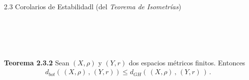 \documentclass{beamer}
\begin{document}
\begin{frame}{2.3 Corolarios de Estabilidadl (del \emph{Teorema de Isometr\'ias})}
    \begin{minipage}{0.45\textwidth}
   $\,$\hfill \scalebox{0.7}{Teorema de Isometr\'ias:$\,\,\,\,\,\,$}
    \end{minipage} \begin{minipage}{0.45\textwidth}
    \end{minipage}\\
    \vspace{1em}
    \centering
    \begin{minipage}{0.2\textwidth}
    \scalebox{0.7}{Teorema 1.5.4:}
    \end{minipage}\begin{minipage}{0.45\textwidth}
    \end{minipage}\\

    \vspace{3em}
    \begin{block}{\textbf{Teorema 2.3.2}}
    Sean $\left( X,\rho\right)$ y $\left( Y,r\right)$ dos espacios m\'etricos finitos. Entonces
    \begin{gather*}
    d_{bot}\left( \,\left( X,\rho\right)\,,\, \left( Y,r\right) \right)\leq d_{GH}\left(\,\left( X,\rho\right)\,,\, \left( Y,r\right)\,\right)\,.
    \end{gather*}
    \end{block}
\end{frame}
\end{document}
